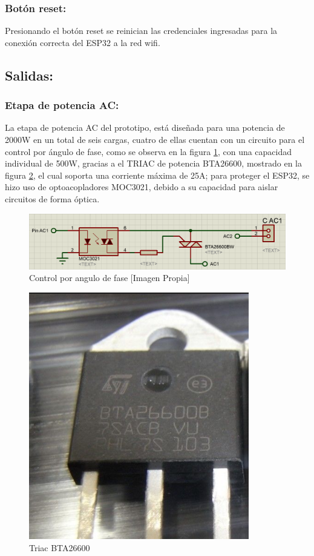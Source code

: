 	\subsubsection{Botón reset:}
		Presionando el botón reset se reinician las credenciales ingresadas para la conexión correcta del ESP32 a la red wifi.\\
		
	\subsection{Salidas:}
	\subsubsection{Etapa de potencia AC:}
		La etapa de potencia AC del prototipo, está diseñada para una potencia de 2000W en un total de seis cargas, cuatro de ellas cuentan con un circuito para el control por ángulo de fase, como se observa en la figura \ref{fig:CAC1}, con una capacidad individual de 500W, gracias a el TRIAC de potencia BTA26600, mostrado en la figura \ref{fig:TRIAC}, el cual soporta una corriente máxima de 25A; para proteger el ESP32, se hizo uso de optoacopladores MOC3021, debido a su capacidad para aislar circuitos de forma óptica.\\
		
		\begin{figure}[H]
			\centering
			\caption{Control por angulo de fase [Imagen Propia]}
			\label{fig:CAC1}
			\includegraphics[width=0.8\linewidth]{Imagenes/CAC1}
		\end{figure}
	
		\begin{figure}[H]
			\centering
			\caption{Triac BTA26600 \cite{TRIAC}}
			\label{fig:TRIAC}
			\includegraphics[width=0.35\linewidth]{Imagenes/TRIAC}
		\end{figure}
	
